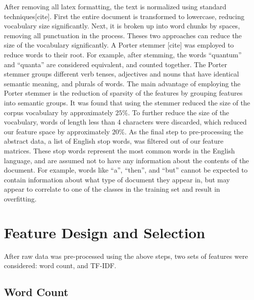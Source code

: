 \documentclass[10pt,twocolumn]{article}
\begin{document}
After removing all latex formatting, the text is normalized using standard techniques[cite]. First the entire document is transformed to lowercase, reducing vocabulary size significantly. Next, it is broken up into word chunks by spaces, removing all punctuation in the process. Theses two approaches can reduce the size of the vocabulary significantly. A Porter stemmer [cite] was employed to reduce words to their root.  For example, after stemming, the words ``quantum'' and ``quanta'' are considered equivalent, and counted together. The Porter stemmer groups different verb tenses, adjectives and nouns that have identical semantic meaning, and plurals of words.  The main advantage of employing the Porter stemmer is the reduction of sparsity of the features by grouping features into semantic groups.  It was found that using the stemmer reduced the size of the corpus vocabulary by approximately $25\%$.  To further reduce the size of the vocabulary, words of length less than 4 characters were discarded, which reduced our feature space by approximately $20\%$.  As the final step to pre-processing the abstract data, a list of English stop words, was filtered out of our feature matrices.  These stop words represent the most common words in the English language, and are assumed not to have any information about the contents of the document.  For example, words like ``a'', ``then'', and ``but'' cannot be expected to contain information about what type of document they appear in, but may appear to correlate to one of the classes in the training set and result in overfitting.

\section*{Feature Design and Selection}

After raw data was pre-processed using the above steps, two sets of features were considered: word count, and TF-IDF.

\subsection*{Word Count}
\end{document}
